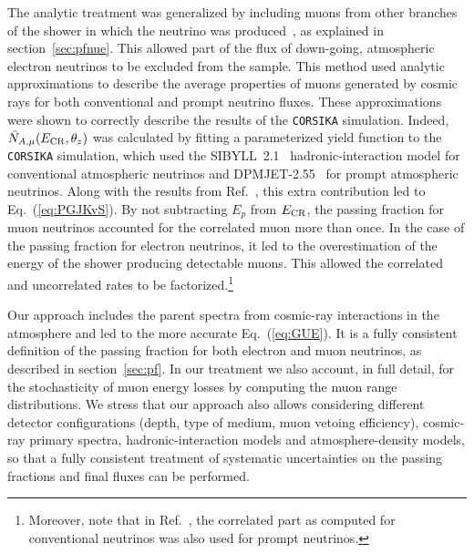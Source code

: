 \documentclass[aps,prd,showpacs,letterpaper,onecolumn,longbibliography,superscriptaddress,notitlepage,nofootinbib]{revtex4-1}%
\newcommand{\ECR}{E_{\rm CR}}
\newcommand{\CORSIKA}{\texttt{CORSIKA}}
\begin{document}
The analytic treatment was generalized by including muons from other branches of the shower in which the neutrino was produced~\cite{Gaisser:2014bja}, as explained in section~\ref{sec:pfnue}. This allowed part of the flux of down-going, atmospheric electron neutrinos to be excluded from the sample. This method used analytic approximations to describe the average properties of muons generated by cosmic rays for both conventional and prompt neutrino fluxes. These approximations were shown to correctly describe the results of the \CORSIKA{} simulation. Indeed, $\bar{N}_{A, \mu}(\ECR, \theta_z)$ was calculated by fitting a parameterized yield function to the \CORSIKA{} simulation, which used the SIBYLL~2.1~\cite{Ahn:2009wx} hadronic-interaction model for conventional atmospheric neutrinos and DPMJET-2.55~\cite{Ranft:1999fy, Ranft:1999qe, Berghaus:2007hp} for prompt atmospheric neutrinos. Along with the results from Ref.~\cite{Schonert:2008is}, this extra contribution led to Eq.~(\ref{eq:PGJKvS}). By not subtracting $E_p$ from $\ECR$, the passing fraction for muon neutrinos accounted for the correlated muon more than once. In the case of the passing fraction for electron neutrinos, it led to the overestimation of the energy of the shower producing detectable muons. This allowed the correlated and uncorrelated rates to be factorized.\footnote{Moreover, note that in Ref.~\cite{Gaisser:2014bja}, the correlated part as computed for conventional neutrinos was also used for prompt neutrinos.}

Our approach includes the parent spectra from cosmic-ray interactions in the atmosphere and led to the more accurate Eq.~(\ref{eq:GUE}). It is a fully consistent definition of the passing fraction for both electron and muon neutrinos, as described in section~\ref{sec:pf}. In our treatment we also account, in full detail, for the stochasticity of muon energy losses by computing the muon range distributions. We stress that our approach also allows considering different detector configurations (depth, type of medium, muon vetoing efficiency), cosmic-ray primary spectra, hadronic-interaction models and atmosphere-density models, so that a fully consistent treatment of systematic uncertainties on the passing fractions and final fluxes can be performed.
\end{document}
